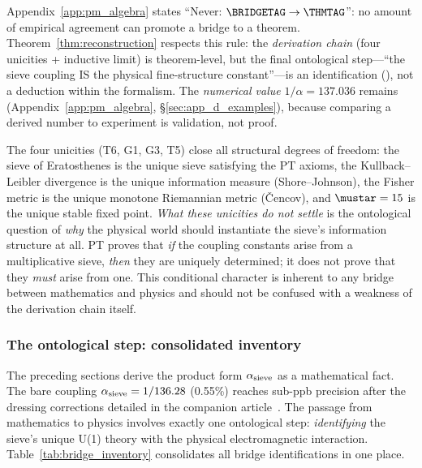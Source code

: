 \documentclass[12pt,a4paper]{article}
\begin{document}
\begin{remark}\mBR
\label{rem:bridge_vs_thm}
Appendix~\ref{app:pm_algebra} states ``Never: $\BRIDGETAG \to \THMTAG$'': no amount of
empirical agreement can promote a bridge to a theorem.
Theorem~\ref{thm:reconstruction} respects this rule:
the \emph{derivation chain} (four unicities + inductive limit) is
theorem-level, but the final ontological step---``the sieve coupling
IS the physical fine-structure constant''---is an identification
(\BRIDGETAG), not a deduction within the formalism.
The \emph{numerical value} $1/\alpha = 137.036$ remains \VALTAG{}
(Appendix~\ref{app:pm_algebra}, \S\ref{sec:app_d_examples}), because comparing a
derived number to experiment is validation, not proof.
\end{remark}

\begin{remark}\mBR
\label{rem:ontological_caveat}
The four unicities (T6, G1, G3, T5) close all structural degrees
of freedom: the sieve of Eratosthenes is the unique sieve satisfying
the PT axioms, the Kullback--Leibler divergence is the unique
information measure (Shore--Johnson), the Fisher metric is the unique
monotone Riemannian metric (\v{C}encov), and $\mustar = 15$ is the
unique stable fixed point.  \emph{What these unicities do not
settle} is the ontological question of \emph{why} the physical
world should instantiate the sieve's information structure at all.
PT proves that \emph{if} the coupling constants arise from a
multiplicative sieve, \emph{then} they are uniquely determined;
it does not prove that they \emph{must} arise from one.
This conditional character is inherent to any bridge between
mathematics and physics and should not be confused with a weakness
of the derivation chain itself.
\end{remark}

\subsubsection{The ontological step: consolidated inventory}
\label{sec:ch9_ontological_inventory}

The preceding sections derive the product form $\alpha_{\rm sieve}$
as a mathematical fact.  The bare coupling $\alpha_{\rm sieve} = 1/136.28$
(0.55\%) reaches sub-ppb precision after the dressing corrections
detailed in the companion article~\cite{companion_physics}.
The passage from mathematics to physics involves exactly
one ontological step: \emph{identifying} the sieve's unique U(1) theory
with the physical electromagnetic interaction.
Table~\ref{tab:bridge_inventory} consolidates all bridge identifications
in one place.
\end{document}
